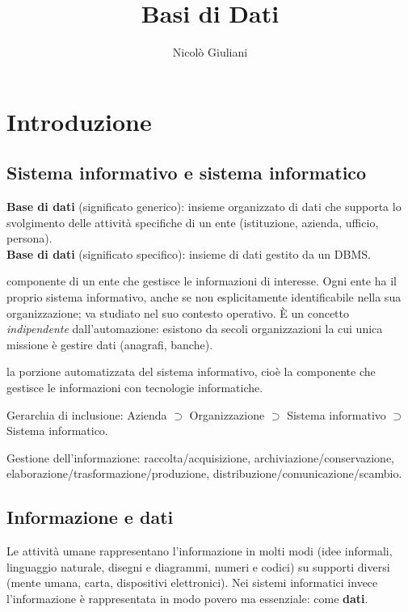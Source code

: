 \documentclass[a4paper,12pt]{article}
\title{Basi di Dati}
\author{Nicolò Giuliani}
\date{}
\begin{document}
\maketitle
\tableofcontents
\newpage

\section{Introduzione}

\subsection{Sistema informativo e sistema informatico}

\textbf{Base di dati} (significato generico): insieme organizzato di dati che
supporta lo svolgimento delle attività specifiche di un ente (istituzione,
azienda, ufficio, persona).\\
\textbf{Base di dati} (significato specifico): insieme di dati gestito da un
DBMS.

\begin{description}[style=nextline]
  \item[Sistema informativo] componente di un ente che gestisce le informazioni
    di interesse. Ogni ente ha il proprio sistema informativo, anche se non
    esplicitamente identificabile nella sua organizzazione; va studiato nel suo
    contesto operativo. È un concetto \emph{indipendente} dall'automazione:
    esistono da secoli organizzazioni la cui unica missione è gestire dati
    (anagrafi, banche).
  \item[Sistema informatico] la porzione automatizzata del sistema informativo,
    cioè la componente che gestisce le informazioni con tecnologie
    informatiche.
\end{description}

Gerarchia di inclusione: Azienda $\supset$ Organizzazione $\supset$ Sistema
informativo $\supset$ Sistema informatico.

Gestione dell'informazione: raccolta/acquisizione, archiviazione/conservazione,
elaborazione/trasformazione/produzione, distribuzione/comunicazione/scambio.

\subsection{Informazione e dati}

Le attività umane rappresentano l'informazione in molti modi (idee informali,
linguaggio naturale, disegni e diagrammi, numeri e codici) su supporti diversi
(mente umana, carta, dispositivi elettronici). Nei sistemi informatici invece
l'informazione è rappresentata in modo povero ma essenziale: come \textbf{dati}.
\end{document}
